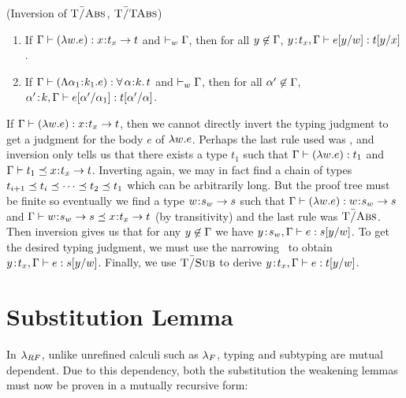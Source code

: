 \begin{lemma} (Inversion of $\tAbs$, $\tTAbs$) \label{lem:inversion} 
    \begin{enumerate}
    \item If $\hastype{\tcenv}{(\vabs{w}{\sexpr})}{\functype{x}{\stype_x}{\stype}}$
    and $\isWellFormedE{\tcenv}$,
    then for all $\notmem{y}{{\tcenv}}$,
    $\hastype{\bind{y}{\stype_x},\tcenv}{\subst{\sexpr}{w}{y}}{\subst{\stype}{x}{y}}$.
    \item If $\hastype{\tcenv}{(\tabs{\al_1}{\skind_1}{\sexpr})}{\polytype{\al}{\skind}{\stype}}$
    and $\isWellFormedE{\tcenv}$,
    then for all $\notmem{\al'}{{\tcenv}}$, 
    $\hastype{\bind{\al'}{\skind},\tcenv}{\subst{\sexpr}{\al_1}{\al'}}{\subst{\stype}{\al}{\al'}}$. %
    \end{enumerate}
\end{lemma}
%
If $\hastype{\tcenv}{(\vabs{w}{e})}{\functype{x}{t_x}{t}}$,
then we cannot directly invert the typing judgment
to get a judgment for the body $e$ of $\vabs{w}{e}$.
%
Perhaps the last rule used was \tSub,
and inversion only tells us that there
exists a type $t_1$ such that
$\hastype{\tcenv}{(\vabs{w}{e})}{t_1}$
and $\isSubType{\tcenv}{t_1}{\functype{x}{t_x}{t}}$.
%
Inverting again, we may in fact find a chain
of types $t_{i+1} \subt t_i \subt \cdots \subt t_2 \subt t_1$
which can be arbitrarily long.
%
But the proof tree must be finite so eventually
we find a type $\functype{w}{s_w}{s}$ such that
$\hastype{\tcenv}{(\vabs{w}{e})}{\functype{w}{s_w}{s}}$
and $\isSubType{\tcenv}{\functype{w}{s_w}{s}}{\functype{x}{t_x}{t}}$
(by transitivity)
and the last rule was $\tAbs$.
%
Then inversion gives us that for any $\notmem{y}{\tcenv}$
we have
$\hastype{\bind{y}{s_w}, \tcenv}{e}{\subst{s}{w}{y}}$.
To get the desired typing judgment, we must
use the narrowing~ to obtain
$\hastype{\bind{y}{t_x}, \tcenv}{e}{\subst{s}{w}{y}}$.
Finally, we use $\tSub$ to derive
$\hastype{\bind{y}{t_x}, \tcenv}{e}{\subst{t}{w}{y}}$.

\section{Substitution Lemma}
\label{sec:soundness:substitution}

%
In $\sysrf$, unlike unrefined calculi such as $\sysf$, 
typing and subtyping are mutual dependent. 
%
Due to this dependency, both the substitution
the weakening lemmas
must now be proven
in a mutually recursive form: %

